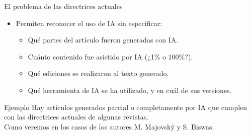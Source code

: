 \begin{frame}{El problema de las directrices actuales}
    \begin{itemize}
        \item Permiten reconocer el uso de IA sin especificar:
              \begin{itemize}
                  \item Qué partes del artículo fueron generadas con IA.
                  \item Cuánto contenido fue asistido por IA (¿1\% o 100\%?).
                  \item Qué ediciones se realizaron al texto generado.
                  \item Qué herramienta de IA se ha utilizado, y en cuál de sus versiones.
              \end{itemize}
    \end{itemize}
    \begin{boxA}{Ejemplo}
        Hay artículos generados parcial o completamente por IA que cumplen con las directrices actuales de algunas revistas.\\[1em]
        {\small Como veremos en los casos de los autores M. Majovský y S. Biswas.}
    \end{boxA}
\end{frame}

